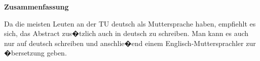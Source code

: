 \thispagestyle{empty}
\vspace*{0.2cm}

\begin{center}
    \textbf{Zusammenfassung}
\end{center}

\vspace*{0.2cm}

\noindent 
Da die meisten Leuten an der TU deutsch als Muttersprache haben, empfiehlt es sich, das Abstract zus�tzlich auch in deutsch zu schreiben. Man kann es auch nur auf deutsch schreiben und anschlie�end einem Englisch-Muttersprachler zur �bersetzung geben.
